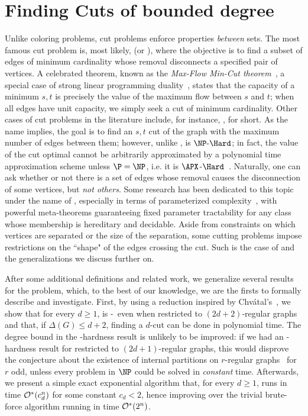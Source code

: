 \chapter{Finding Cuts of bounded degree}
\label{ch:cuts}
Unlike coloring problems, cut problems enforce properties \textit{between} sets.
The most famous cut problem is, most likely,  (or ), where the objective is to find a subset of edges of minimum cardinality whose removal disconnects a specified pair of vertices.
A celebrated theorem, known as the \textit{Max-Flow Min-Cut theorem}~\citep{ford_fulkerson}, a special case of strong linear programming duality~\citep{linear_optimization}, states that the capacity of a minimum $s,t$ is precisely the value of the maximum flow between $s$ and $t$; when all edges have unit capacity, we simply seek a cut of minimum cardinality.
Other cases of cut problems in the literature include, for instance, ,  for short.
As the name implies, the goal is to find an $s,t$ cut of the graph with the maximum number of edges between them; however, unlike ,  is $\NPH$; in fact, the value of the cut optimal cannot be arbitrarily approximated by a polynomial time approximation scheme unless $\P = \NP$, i.e. it is $\APX$-$\Hard$~\citep{approximation}.
Naturally, one can ask whether or not there is a set of edges whose removal causes the disconnection of some vertices, but \textit{not others}.
Some research has been dedicated to this topic under the name of , especially in terms of parameterized complexity~\citep{marx_treewidth_reduction,marx_separation}, with powerful meta-theorems guaranteeing fixed parameter tractability for any class whose membership is hereditary and decidable.
Aside from constraints on which vertices are separated or the size of the separation, some cutting problems impose restrictions on the ``shape" of the edges crossing the cut.
Such is the case of  and the generalizations we discuss further on.

After some additional definitions and related work, we generalize several results for the  problem, which, to the best of our knowledge, we are the firsts to formally describe and investigate.
First, by using a reduction inspired by Chvátal's~\citep{chvatal_matching_cut}, we show that for every $d \geq 1$,  is \NP-\Complete\ even when restricted to $(2d+2)$-regular graphs and that, if $\Delta(G) \leq d+2$, finding a $d$-cut can be done in polynomial time. The degree bound in the \NP-hardness result is unlikely to be improved: if we had an \NP-hardness result for  restricted to $(2d+1)$-regular graphs, this would disprove the conjecture about the existence of internal partitions on $r$-regular graphs~\citep{DeVos09,internal_partition_regular6,internal_partition_regular3_4} for $r$ odd, unless every problem in $\NP$ could be solved in \textit{constant} time.
Afterwards, we present a simple exact exponential algorithm that, for every $d \geq 1$, runs in time $\mathcal{O}^*\!\left(c_d^n\right)$ for some constant $c_d < 2$, hence improving over the trivial brute-force algorithm running in time $\mathcal{O}^*\!\left(2^n\right)$.

